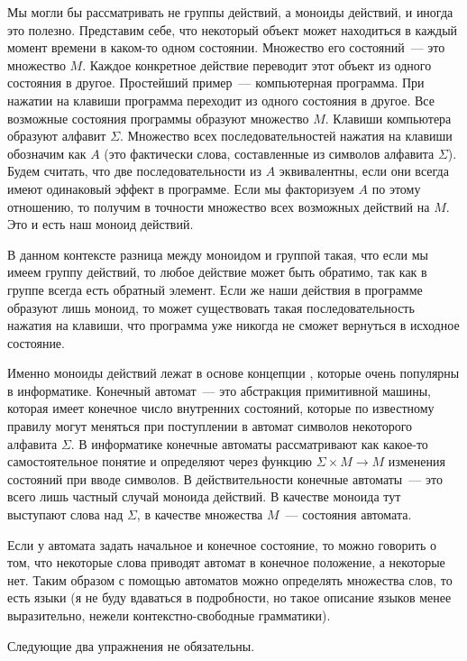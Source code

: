 Мы могли бы рассматривать не группы действий, а моноиды действий, и иногда это полезно. Представим себе, что некоторый объект может находиться в каждый момент времени в каком-то одном состоянии. Множество его состояний~— это множество $M$. Каждое конкретное действие переводит этот объект из одного состояния в другое. Простейший пример~— компьютерная программа. При нажатии на клавиши программа переходит из одного состояния в другое. Все возможные состояния программы образуют множество $M$. Клавиши компьютера образуют алфавит $\Sigma$. Множество всех последовательностей нажатия на клавиши обозначим как $A$ (это фактически слова, составленные из символов алфавита $\Sigma$). Будем считать, что две последовательности из $A$ эквивалентны, если они всегда имеют одинаковый эффект в программе. Если мы факторизуем $A$ по этому отношению, то получим в точности множество всех возможных действий на $M$. Это и есть наш моноид действий.

В данном контексте разница между моноидом и группой такая, что если мы имеем группу действий, то любое действие может быть обратимо, так как в группе всегда есть обратный элемент. Если же наши действия в программе образуют лишь моноид, то может существовать такая последовательность нажатия на клавиши, что программа уже никогда не сможет вернуться в исходное состояние.

Именно моноиды действий лежат в основе концепции , которые очень популярны в информатике. Конечный автомат~— это абстракция примитивной машины, которая имеет конечное число внутренних состояний, которые по известному правилу могут меняться при поступлении в автомат символов некоторого алфавита $\Sigma$. В информатике конечные автоматы рассматривают как какое-то самостоятельное понятие и определяют через функцию $\Sigma\times M\to M$ изменения состояний при вводе символов. В действительности конечные автоматы~— это всего лишь частный случай моноида действий. В качестве моноида тут выступают слова над $\Sigma$, в качестве множества $M$~— состояния автомата.

Если у автомата задать начальное и конечное состояние, то можно говорить о том, что некоторые слова приводят автомат в конечное положение, а некоторые нет. Таким образом с помощью автоматов можно определять множества слов, то есть языки (я не буду вдаваться в подробности, но такое описание языков менее выразительно, нежели контекстно-свободные грамматики).

Следующие два упражнения не обязательны.

